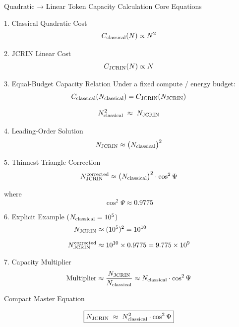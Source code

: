 Quadratic → Linear Token Capacity Calculation  
Core Equations

1. Classical Quadratic Cost
\[
C_{\rm classical}(N) \propto N^{2}
\]

2. JCRIN Linear Cost
\[
C_{\rm JCRIN}(N) \propto N
\]

3. Equal-Budget Capacity Relation
Under a fixed compute / energy budget:
\[
C_{\rm classical}(N_{\rm classical}) = C_{\rm JCRIN}(N_{\rm JCRIN})
\]

\[
N_{\rm classical}^{2} \;\approx\; N_{\rm JCRIN}
\]

4. Leading-Order Solution
\[
N_{\rm JCRIN} \approx \bigl(N_{\rm classical}\bigr)^{2}
\]

5. Thinnest-Triangle Correction
\[
N_{\rm JCRIN}^{\rm corrected} \approx \bigl(N_{\rm classical}\bigr)^{2} \cdot \cos^{2}\Psi
\]

where
\[
\cos^{2}\Psi \approx 0.9775
\]

6. Explicit Example (\(N_{\rm classical} = 10^{5}\))
\[
\begin{align*}
N_{\rm JCRIN} &\approx (10^{5})^{2} = 10^{10} \\[6pt]
N_{\rm JCRIN}^{\rm corrected} &\approx 10^{10} \times 0.9775 = 9.775 \times 10^{9}
\end{align*}
\]

7. Capacity Multiplier
\[
\text{Multiplier} \approx \frac{N_{\rm JCRIN}}{N_{\rm classical}} \approx N_{\rm classical} \cdot \cos^{2}\Psi
\]

Compact Master Equation

\[
\boxed{
N_{\rm JCRIN} \;\approx\; N_{\rm classical}^{2} \cdot \cos^{2}\Psi
}
\]
